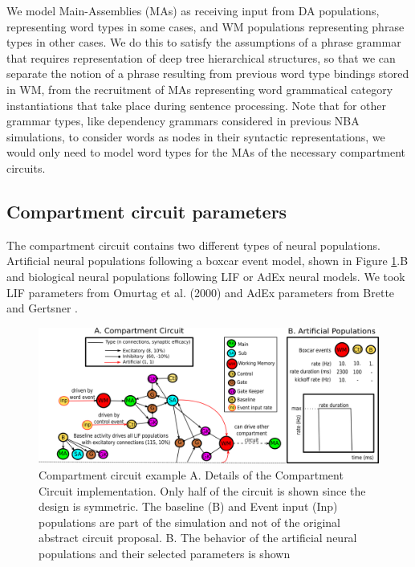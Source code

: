 \documentclass[10pt]{article}
\begin{document}
We model Main-Assemblies (MAs)  as receiving input from DA populations, representing word types in some cases, and WM populations representing phrase types in other cases.
We do this to satisfy the assumptions of a phrase grammar that requires representation of deep tree hierarchical structures, so that we can separate the notion of a phrase resulting from previous word type bindings stored in WM, from the recruitment of MAs representing word grammatical category instantiations that take place during sentence processing.
Note that for other grammar types, like dependency grammars considered in previous NBA simulations\cite{velde2015ambiguity}, to consider words as nodes in their syntactic representations, we would only need to model word types for the MAs of the necessary compartment circuits.


\subsection{Compartment circuit parameters}\label{sec:circuit-parameters}

The compartment circuit contains two different types of neural populations.
Artificial neural populations following a boxcar event model, shown in Figure \ref{fig:circuit-spec}.B and biological neural populations following LIF or AdEx neural models.
We took LIF parameters from Omurtag et al. (2000) \cite{omurtag2000simulation} and AdEx parameters
from Brette and Gertsner \cite{Brette_2005}.

\begin{figure}[h!]
  \begin{center}
    \includegraphics[width=1.00\columnwidth]{figures/circuit_specs3}
    \caption{{Compartment circuit example {\label{fig:circuit-spec}} A.
Details
        of the Compartment Circuit implementation.
Only half of the
        circuit is shown since the design is symmetric.
The baseline
        (B) and Event input (Inp) populations are part of the
        simulation and not of the original abstract circuit proposal.
        B.
The behavior of the artificial neural populations and their
        selected parameters is shown%
      }}
  \end{center}
\end{figure}
\end{document}
